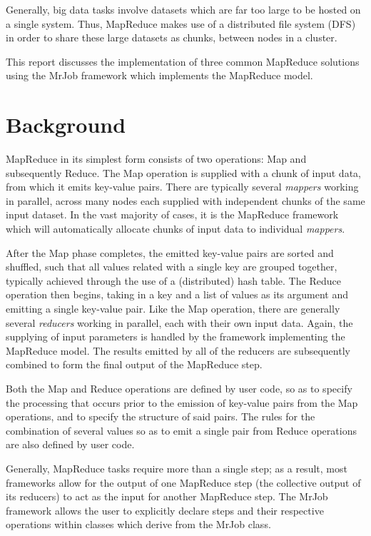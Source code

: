 \documentclass[journal,10pt]{IEEEtran}
\begin{document}
Generally, big data tasks involve datasets which are far too large to be hosted on a single system. Thus, MapReduce makes use of a distributed file system (DFS) in order to share these large datasets as chunks, between nodes in a cluster.

This report discusses the implementation of three common MapReduce solutions using the MrJob framework which implements the MapReduce model.

\section{Background}
MapReduce in its simplest form consists of two operations: Map and subsequently Reduce. The Map operation is supplied with a chunk of input data, from which it emits key-value pairs. There are typically several \textit{mappers} working in parallel, across many nodes each supplied with independent chunks of the same input dataset. In the vast majority of cases, it is the MapReduce framework which will automatically allocate chunks of input data to individual \textit{mappers}.


After the Map phase completes, the emitted key-value pairs are sorted and shuffled, such that all values related with a single key are grouped together, typically achieved through the use of a (distributed) hash table. The Reduce operation then begins, taking in a key and a list of values as its argument and emitting a single key-value pair. Like the Map operation, there are generally several \textit{reducers} working in parallel, each with their own input data. Again, the supplying of input parameters is handled by the framework implementing the MapReduce model. The results emitted by all of the reducers are subsequently combined to form the final output of the MapReduce step.



Both the Map and Reduce operations are defined by user code, so as to specify the processing that occurs prior to the emission of key-value pairs from the Map operations, and to specify the structure of said pairs. The rules for the combination of several values so as to emit a single pair from Reduce operations are also defined by user code.

Generally, MapReduce tasks require more than a single step; as a result, most frameworks allow for the output of one MapReduce step (the collective output of its reducers) to act as the input for another MapReduce step. The MrJob framework allows the user to explicitly declare steps and their respective operations within classes which derive from the MrJob class.
\end{document}
